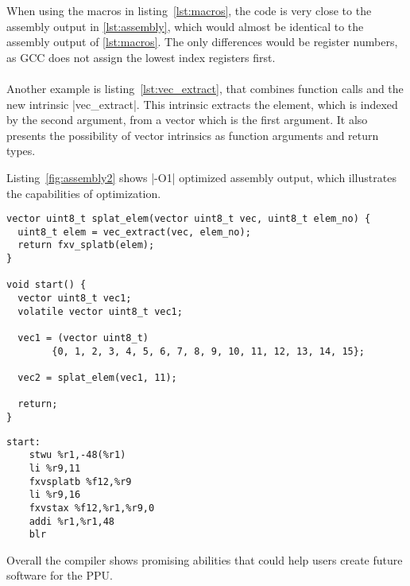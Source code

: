 When using the macros in listing~\ref{lst:macros}, the code is very close to the assembly output in \ref{lst:assembly}, which would almost be identical to the assembly output of \ref{lst:macros}.
The only differences would be register numbers, as \ac{GCC} does not assign the lowest index registers first.
\\
\\
Another example is listing~\ref{lst:vec_extract}, that combines function calls and the new intrinsic |vec_extract|.
This intrinsic extracts the element, which is indexed by the second argument, from a vector which is the first argument.
It also presents the possibility of vector intrinsics as function arguments and return types.

Listing~\ref{fig:assembly2} shows |-O1| optimized assembly output, which illustrates the capabilities of optimization.
\begin{adjustbox}{center, width=1.1\textwidth}
\lstset{numbers=none}
    \begin{minipage}[t]{.4\textwidth}
    \begin{lstlisting}[caption={Code with Intrinsics}, label=lst:intrinsics]
vector uint8_t splat_elem(vector uint8_t vec, uint8_t elem_no) {
  uint8_t elem = vec_extract(vec, elem_no);
  return fxv_splatb(elem);
}

void start() {
  vector uint8_t vec1;
  volatile vector uint8_t vec1;

  vec1 = (vector uint8_t)
        {0, 1, 2, 3, 4, 5, 6, 7, 8, 9, 10, 11, 12, 13, 14, 15};

  vec2 = splat_elem(vec1, 11);

  return;
} 
\end{lstlisting}
\end{minipage}
\begin{minipage}[t]{.4\textwidth}
    \begin{lstlisting}[caption={Assembly Output for \ref{lst:intrinsics}}, label=lst:assembly]
start:
	stwu %r1,-48(%r1)
	li %r9,11
	fxvsplatb %f12,%r9
	li %r9,16
	fxvstax %f12,%r1,%r9,0
	addi %r1,%r1,48
	blr
\end{lstlisting}
\end{minipage}
\end{adjustbox}

Overall the compiler shows promising abilities that could help users create future software for the \ac{PPU}.
